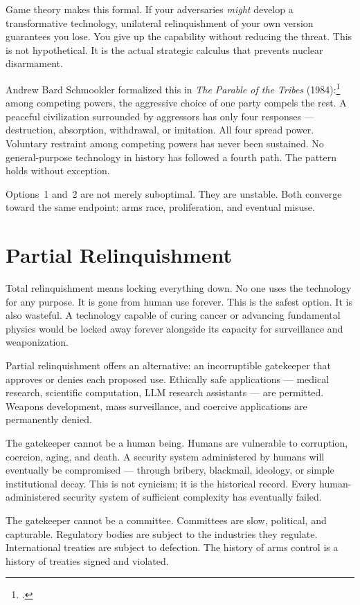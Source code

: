 Game theory makes this formal. If your adversaries \textit{might} develop a transformative technology, unilateral relinquishment of your own version guarantees you lose. You give up the capability without reducing the threat. This is not hypothetical. It is the actual strategic calculus that prevents nuclear disarmament.

Andrew Bard Schmookler formalized this in \textit{The Parable of the Tribes} (1984):\footcite{schmookler1984} among competing powers, the aggressive choice of one party compels the rest. A peaceful civilization surrounded by aggressors has only four responses --- destruction, absorption, withdrawal, or imitation. All four spread power. Voluntary restraint among competing powers has never been sustained. No general-purpose technology in history has followed a fourth path. The pattern holds without exception.

Options~1 and~2 are not merely suboptimal. They are unstable. Both converge toward the same endpoint: arms race, proliferation, and eventual misuse.

\section*{Partial Relinquishment}
\label{pos22:partial-relinquishment}

Total relinquishment means locking everything down. No one uses the technology for any purpose. It is gone from human use forever. This is the safest option. It is also wasteful. A technology capable of curing cancer or advancing fundamental physics would be locked away forever alongside its capacity for surveillance and weaponization.

Partial relinquishment offers an alternative: an incorruptible gatekeeper that approves or denies each proposed use. Ethically safe applications --- medical research, scientific computation, LLM research assistants --- are permitted. Weapons development, mass surveillance, and coercive applications are permanently denied.

The gatekeeper cannot be a human being. Humans are vulnerable to corruption, coercion, aging, and death. A security system administered by humans will eventually be compromised --- through bribery, blackmail, ideology, or simple institutional decay. This is not cynicism; it is the historical record. Every human-administered security system of sufficient complexity has eventually failed.

The gatekeeper cannot be a committee. Committees are slow, political, and capturable. Regulatory bodies are subject to the industries they regulate. International treaties are subject to defection. The history of arms control is a history of treaties signed and violated.

